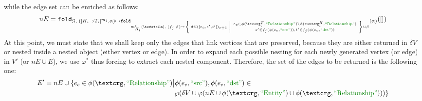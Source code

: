 while the edge set can be enriched as follows:
\begin{equation}\label{eq:newgenE}
nE=\texttt{fold}_{\mathcal{G},\;([H_i\to T_i]^{m_i},\alpha)\mapsto \texttt{fold}_{m^i_{H_i}(\nested),\;(f_j,\beta)\mapsto \Set{dtl([e_c,s',t'])_{c+1}|\genfrac{}{}{0pt}{}{e_c\in \phi(\ngraph_i^T,\RELA)\backslash\phi(\ngraph_i^H,\RELA)}{s'\in f_j(\phi(e_c,\SRC)),t'\in f_j(\phi(e_c,\DST))}}\cup\beta }(\alpha)}([])
\end{equation}
At this point, we must state that we shall keep only the edges that link vertices that are preserved, because they are either returned in $\delta V$ or nested inside a nested object (either vertex or edge). In order to expand each possible nesting for each newly generated vertex (or edge) in $V'$ (or $nE\cup E$), we use $\varphi^*$  thus forcing to extract each nested component. Therefore, the set of the edges to be returned is the following one:
\begin{equation}\label{eq:eFinal}
\begin{split}
E' = nE \cup \{e_c\in \phi(\ngraph,\RELA)\big |&\phi(e_c,\SRC),\phi(e_c,\DST)\in\\
	&\partof{\delta V\cup\varphi(nE\cup \phi(\ngraph,\ONTA)\cup \phi(\ngraph,\RELA))}\}\\
\end{split}
\end{equation}



